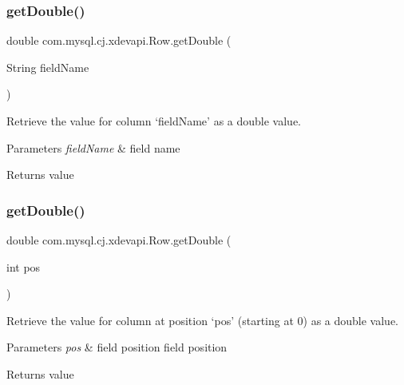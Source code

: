 \subsubsection{\texorpdfstring{get\+Double()}{getDouble()}\hspace{0.1cm}{\footnotesize\ttfamily [1/2]}}
{\footnotesize\ttfamily double com.\+mysql.\+cj.\+xdevapi.\+Row.\+get\+Double (\begin{DoxyParamCaption}\item[{String}]{field\+Name }\end{DoxyParamCaption})}

Retrieve the value for column `field\+Name' as a double value.


\begin{DoxyParams}{Parameters}
{\em field\+Name} & field name \\
\hline
\end{DoxyParams}
\begin{DoxyReturn}{Returns}
value 
\end{DoxyReturn}
\mbox{\label{interfacecom_1_1mysql_1_1cj_1_1xdevapi_1_1_row_a08e5f9ea0d2bf9dfd262d75c59aee6ec}} 
\subsubsection{\texorpdfstring{get\+Double()}{getDouble()}\hspace{0.1cm}{\footnotesize\ttfamily [2/2]}}
{\footnotesize\ttfamily double com.\+mysql.\+cj.\+xdevapi.\+Row.\+get\+Double (\begin{DoxyParamCaption}\item[{int}]{pos }\end{DoxyParamCaption})}

Retrieve the value for column at position `pos' (starting at 0) as a double value.


\begin{DoxyParams}{Parameters}
{\em pos} & field position field position \\
\hline
\end{DoxyParams}
\begin{DoxyReturn}{Returns}
value 
\end{DoxyReturn}
\mbox{\label{interfacecom_1_1mysql_1_1cj_1_1xdevapi_1_1_row_a62139a557ddaf76dc42a282f32184af2}} 
